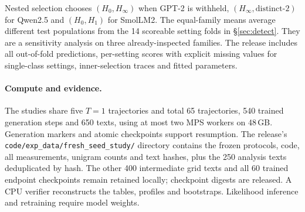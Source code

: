 \documentclass[10pt]{article}
\theoremstyle{plain}
\theoremstyle{definition}
\newcommand{\Hz}{H_0}
\newcommand{\Hinf}{H_\infty}
\begin{document}
Nested selection chooses $(\Hz,\Hinf)$ when GPT-2 is withheld,
$(\Hinf,\text{distinct-}2)$ for Qwen2.5 and $(\Hz,H_1)$ for SmolLM2.
The equal-family means average different test populations from the 14 scoreable setting folds
in \S\ref{sec:detect}. They are a sensitivity analysis on three already-inspected families.
The release includes all out-of-fold predictions, per-setting scores with explicit missing
values for single-class settings, inner-selection traces and fitted parameters.

\paragraph{Compute and evidence.} The studies share five $T=1$ trajectories and total 65
trajectories, 540 trained generation steps and 650 texts, using at most two MPS workers
on 48\,GB. Generation markers and atomic checkpoints support resumption. The release's
\texttt{code/exp\_data/fresh\_seed\_study/} directory contains the frozen protocols, code, all measurements,
unigram counts and text hashes, plus the 250 analysis texts deduplicated by hash. The other
400 intermediate grid texts and all 60 trained endpoint checkpoints remain retained locally;
checkpoint digests are released. A CPU verifier reconstructs the tables, profiles and
bootstraps. Likelihood inference and retraining require model weights.
\end{document}

